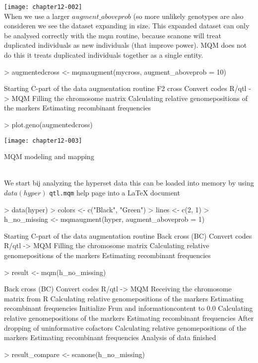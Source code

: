 \documentclass[a4paper]{article}
\begin{document}
\texttt{[image: chapter12-002]}
\\
When we use a larger $augment\_aboveprob$ (so more unlikely genotypes are also consideren we see the dataset expanding in size.
This expanded dataset can only be analysed correctly with the mqm routine, because scanone will treat duplicated individuals
as new individuals (that improve power). MQM does not do this it treats duplicated individuals together as a single entity.
\\
\begin{Schunk}
\begin{Sinput}
> augmentedcross <- mqmaugment(mycross, augment_aboveprob = 10)
\end{Sinput}
\begin{Soutput}
Starting C-part of the data augmentation routine
F2 cross
Convert codes R/qtl -> MQM
Filling the chromosome matrix
Calculating relative genomepositions of the markers
Estimating recombinant frequencies
\end{Soutput}
\begin{Sinput}
> plot.geno(augmentedcross)
\end{Sinput}
\end{Schunk}
\texttt{[image: chapter12-003]}
\clearpage
\begin{Large} MQM modeling and mapping \end{Large}\\
We start bij analyzing the hyperset data this can be loaded into memory by using $data(hyper)$
\texttt{qtl.mqm} help page into a \LaTeX{} document
\\
\begin{Schunk}
\begin{Sinput}
> data(hyper)
> colors <- c("Black", "Green")
> lines <- c(2, 1)
> h_no_missing <- mqmaugment(hyper, augment_aboveprob = 1)
\end{Sinput}
\begin{Soutput}
Starting C-part of the data augmentation routine
Back cross (BC)
Convert codes R/qtl -> MQM
Filling the chromosome matrix
Calculating relative genomepositions of the markers
Estimating recombinant frequencies
\end{Soutput}
\begin{Sinput}
> result <- mqm(h_no_missing)
\end{Sinput}
\begin{Soutput}
Back cross (BC)
Convert codes R/qtl -> MQM
Receiving the chromosome matrix from R
Calculating relative genomepositions of the markers
Estimating recombinant frequencies
Initialize Frun and informationcontent to 0.0
Calculating relative genomepositions of the markers
Estimating recombinant frequencies
After dropping of uninformative cofactors
Calculating relative genomepositions of the markers
Estimating recombinant frequencies
Analysis of data finished
\end{Soutput}
\begin{Sinput}
> result_compare <- scanone(h_no_missing)
\end{Sinput}
\end{Schunk}
\end{document}
